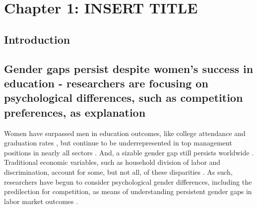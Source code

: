 \documentclass[a4paper,nobind]{templates/ociamthesis}
\begin{document}
\setlength{\textbaselineskip}{22pt plus2pt}

\setlength{\parskip}{2pt plus 1pt}

\setlength{\baselineskip}{\textbaselineskip}

\hypertarget{chapter-1-insert-title}{%
\chapter{Chapter 1: INSERT TITLE}\label{chapter-1-insert-title}}

\hypertarget{introduction}{%
\section{Introduction}\label{introduction}}

\hypertarget{gender-gaps-persist-despite-womens-success-in-education---researchers-are-focusing-on-psychological-differences-such-as-competition-preferences-as-explanation}{%
\section{Gender gaps persist despite women's success in education - researchers are focusing on psychological differences, such as competition preferences, as explanation}\label{gender-gaps-persist-despite-womens-success-in-education---researchers-are-focusing-on-psychological-differences-such-as-competition-preferences-as-explanation}}

Women have surpassed men in education outcomes, like college attendance and graduation rates \autocite{Blau2017,Goldin2006,Stoet2014}, but continue to be underrepresented in top management positions in nearly all sectors \autocite{Bertrand2001}. And, a sizable gender gap still persists worldwide \autocite{Blau2017}. Traditional economic variables, such as household division of labor and discrimination, account for some, but not all, of these disparities \autocite{Blau2017}. As such, researchers have begun to consider psychological gender differences, including the predilection for competition, as means of understanding persistent gender gaps in labor market outcomes \autocite[for review, see][]{Niederle2011}.
\end{document}
